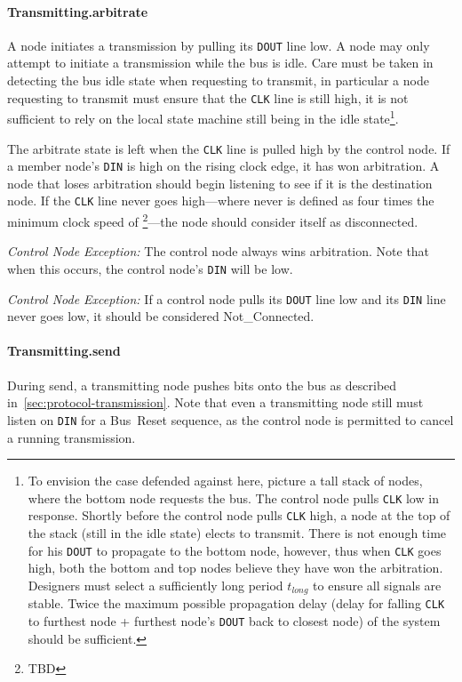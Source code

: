 \paragraph{Transmitting.{\sc arbitrate}}
\label{sec:state-arbitrate}
A node initiates a transmission by pulling its {\tt DOUT} line low. A node may
only attempt to initiate a transmission while the bus is idle. Care must be
taken in detecting the bus idle state when requesting to transmit, in
particular a node requesting to transmit must ensure that the {\tt CLK} line
is still high, it is not sufficient to rely on the local state machine still
being in the {\sc idle} state\footnote{To envision the case defended against
here, picture a tall stack of nodes, where the bottom node requests the bus.
The control node pulls {\tt CLK} low in response. Shortly before the control
node pulls {\tt CLK} high, a node at the top of the stack (still in the {\sc
idle} state) elects to transmit. There is not enough time for his {\tt DOUT}
to propagate to the bottom node, however, thus when {\tt CLK} goes high, both
the bottom and top nodes believe they have won the arbitration. Designers must
select a sufficiently long period $t_{long}$ to ensure all signals are stable.
Twice the maximum possible propagation delay (delay for falling {\tt CLK} to
furthest node + furthest node's {\tt DOUT} back to closest node) of the system
should be sufficient.}.

The {\sc arbitrate} state is left when the {\tt CLK} line is pulled high by
the control node. If a member node's {\tt DIN} is high on the rising clock
edge, it has won arbitration. A node that loses arbitration should begin
listening to see if it is the destination node. If the {\tt CLK} line never
goes high---where never is defined as four times the minimum clock speed of
\bus\footnote{TBD}---the node should consider itself as disconnected.

\medskip
\noindent
{\em Control Node Exception:} The control node always wins arbitration. Note
that when this occurs, the control node's {\tt DIN} will be low.

\medskip
\noindent
{\em Control Node Exception:} If a control node pulls its {\tt DOUT} line low
and its {\tt DIN} line never goes low, it should be considered
{\sc Not\_Connected}.

\paragraph{Transmitting.{\sc send}}
During {\sc send}, a transmitting node pushes bits onto the bus as described
in~\ref{sec:protocol-transmission}. Note that even a transmitting node still
must listen on {\tt DIN} for a Bus~Reset sequence, as the control node is
permitted to cancel a running transmission.

